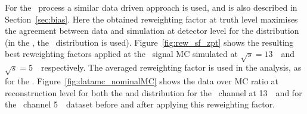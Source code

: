 For the \Zboson\ process a similar data driven approach is used, and is also described in Section~\ref{sec:bias}. Here the obtained reweighting factor at truth level maximises the agreement between data and simulation at detector level for the \ptdilep  distribution (in the \Wboson, the \ut\ distribution is used).  Figure~\ref{fig:rew_sf_zpt} shows the resulting best reweighting factors applied at the \Zboson\ signal MC simulated at $\sqrt{s} = 13$~\TeV\ and $\sqrt{s} = 5$~\TeV\ respectively. The averaged reweighting factor is used in the analysis, as for the \Wboson.
Figure~\ref{fig:datamc_nominalMC} shows the data over MC ratio at reconstruction level for both the  \ptdilep and \ut distribution for the \Zee\ channel at 13~\TeV\ and for the \Zmm\ channel 5~\TeV\ dataset before and after applying this reweighting factor.

